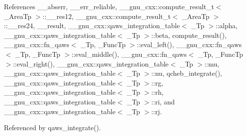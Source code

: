 References \+\_\+\+\_\+abserr, \+\_\+\+\_\+err\+\_\+reliable, \+\_\+\+\_\+gnu\+\_\+cxx\+::compute\+\_\+result\+\_\+t$<$ \+\_\+\+Area\+Tp $>$\+::\+\_\+\+\_\+res12, \+\_\+\+\_\+gnu\+\_\+cxx\+::compute\+\_\+result\+\_\+t$<$ \+\_\+\+Area\+Tp $>$\+::\+\_\+\+\_\+res24, \+\_\+\+\_\+result, \+\_\+\+\_\+gnu\+\_\+cxx\+::qaws\+\_\+integration\+\_\+table$<$ \+\_\+\+Tp $>$\+::alpha, \+\_\+\+\_\+gnu\+\_\+cxx\+::qaws\+\_\+integration\+\_\+table$<$ \+\_\+\+Tp $>$\+::beta, compute\+\_\+result(), \+\_\+\+\_\+gnu\+\_\+cxx\+::fn\+\_\+qaws$<$ \+\_\+\+Tp, \+\_\+\+Func\+Tp $>$\+::eval\+\_\+left(), \+\_\+\+\_\+gnu\+\_\+cxx\+::fn\+\_\+qaws$<$ \+\_\+\+Tp, \+\_\+\+Func\+Tp $>$\+::eval\+\_\+middle(), \+\_\+\+\_\+gnu\+\_\+cxx\+::fn\+\_\+qaws$<$ \+\_\+\+Tp, \+\_\+\+Func\+Tp $>$\+::eval\+\_\+right(), \+\_\+\+\_\+gnu\+\_\+cxx\+::qaws\+\_\+integration\+\_\+table$<$ \+\_\+\+Tp $>$\+::mu, \+\_\+\+\_\+gnu\+\_\+cxx\+::qaws\+\_\+integration\+\_\+table$<$ \+\_\+\+Tp $>$\+::nu, qcheb\+\_\+integrate(), \+\_\+\+\_\+gnu\+\_\+cxx\+::qaws\+\_\+integration\+\_\+table$<$ \+\_\+\+Tp $>$\+::rg, \+\_\+\+\_\+gnu\+\_\+cxx\+::qaws\+\_\+integration\+\_\+table$<$ \+\_\+\+Tp $>$\+::rh, \+\_\+\+\_\+gnu\+\_\+cxx\+::qaws\+\_\+integration\+\_\+table$<$ \+\_\+\+Tp $>$\+::ri, and \+\_\+\+\_\+gnu\+\_\+cxx\+::qaws\+\_\+integration\+\_\+table$<$ \+\_\+\+Tp $>$\+::rj.



Referenced by qaws\+\_\+integrate().


